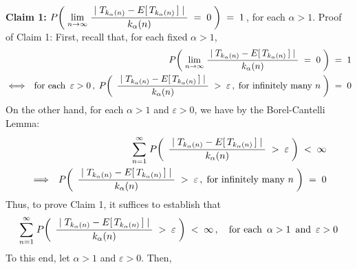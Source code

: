 \begin{enumerate}
\vskip 0.5cm
\noindent
\textbf{Claim 1:}\quad\quad
$P\!\left(\;
	\underset{n\rightarrow\infty}{\lim}\;
		\dfrac{{\color{white}.}\vert\;T_{k_{\alpha}(n)} - E[\,T_{k_{\alpha}(n)}\,]\;\vert{\color{white}.}}{k_{\alpha}(n)}
	\;=\;0
	\;\right)
\;=\;1$\,, for each $\alpha > 1$.
\vskip 0.3cm
\noindent
Proof of Claim 1:\quad
First, recall that, for each fixed $\alpha > 1$,
\begin{eqnarray*}
&&
	P\!\left(\;
	\underset{n\rightarrow\infty}{\lim}\;
		\dfrac{{\color{white}.}\vert\;T_{k_{\alpha}(n)} - E[\,T_{k_{\alpha}(n)}\,]\;\vert{\color{white}.}}{k_{\alpha}(n)}
	\;=\;0
	\;\right)
	\;=\;1
\\
&\Longleftrightarrow&
	\textnormal{for each \,$\varepsilon > 0$}\,,\;
	P\!\left(\;\,
		\dfrac{{\color{white}.}\vert\;T_{k_{\alpha}(n)} - E[\,T_{k_{\alpha}(n)}\,]\;\vert{\color{white}.}}{k_{\alpha}(n)}
		\;>\;\varepsilon\,,\;\textnormal{for infinitely many $n$}
		\;\right)
	\;=\;0
\end{eqnarray*}
On the other hand, for each $\alpha > 1$ and $\varepsilon > 0$, we have by the Borel-Cantelli Lemma:
\begin{eqnarray*}
&&
	\overset{\infty}{\underset{n=1}{\sum}}\;
		P\!\left(\;\,
			\dfrac{{\color{white}.}\vert\;T_{k_{\alpha}(n)} - E[\,T_{k_{\alpha}(n)}\,]\;\vert{\color{white}.}}{k_{\alpha}(n)}
			\;>\;\varepsilon
			\;\right)
	\;<\; \infty
\\
&\Longrightarrow&
	P\!\left(\;\,
		\dfrac{{\color{white}.}\vert\;T_{k_{\alpha}(n)} - E[\,T_{k_{\alpha}(n)}\,]\;\vert{\color{white}.}}{k_{\alpha}(n)}
		\;>\;\varepsilon\,,\;\textnormal{for infinitely many $n$}
		\;\right)
	\;=\;0
\end{eqnarray*}
Thus, to prove Claim 1, it suffices to establish that
\begin{equation*}
\overset{\infty}{\underset{n=1}{\sum}}\;
	P\!\left(\;\,
		\dfrac{{\color{white}.}\vert\;T_{k_{\alpha}(n)} - E[\,T_{k_{\alpha}(n)}\,]\;\vert{\color{white}.}}{k_{\alpha}(n)}
		\;>\;\varepsilon
		\;\right)
\;<\; \infty\,,
\quad\textnormal{for each \,$\alpha > 1$\, and \,$\varepsilon > 0$}
\end{equation*}
To this end, let $\alpha > 1$ and $\varepsilon > 0$. Then,

\end{enumerate}
